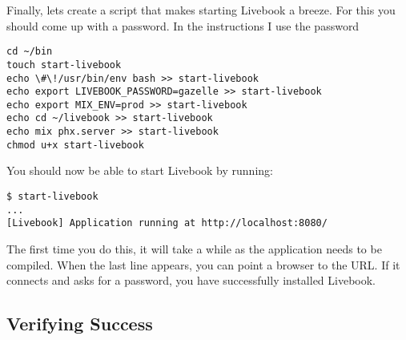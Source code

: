 Finally, lets create a script that makes starting Livebook a breeze. For this you should come up with a password. In the instructions I use the password 

\begin{verbatim}
cd ~/bin
touch start-livebook
echo \#\!/usr/bin/env bash >> start-livebook
echo export LIVEBOOK_PASSWORD=gazelle >> start-livebook
echo export MIX_ENV=prod >> start-livebook
echo cd ~/livebook >> start-livebook
echo mix phx.server >> start-livebook
chmod u+x start-livebook
\end{verbatim}

You should now be able to start Livebook by running:

\begin{verbatim}
$ start-livebook
...
[Livebook] Application running at http://localhost:8080/
\end{verbatim}

The first time you do this, it will take a while as the application needs to be compiled. When the last line appears, you can point a browser to the URL. If it connects and asks for a password, you have successfully installed Livebook.

\subsection{Verifying Success}
